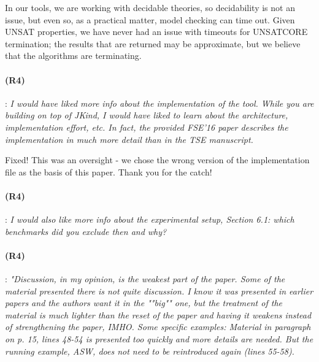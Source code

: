 \documentclass{article}
\begin{document}
In our tools, we are working with decidable theories, so decidability is not an issue, but even so, as a practical matter, model checking can time out.  Given UNSAT properties, we have never had an issue with timeouts for UNSATCORE termination; the results that are returned may be approximate, but we believe that the algorithms are terminating.

\paragraph{(R4)}: \textit{I would have liked more info about the implementation of the tool. While you are building on top of JKind, I would have liked to learn about the architecture, implementation effort, etc. In fact, the provided FSE'16 paper describes the implementation in much more detail than in the TSE manuscript.}
\vspace{0.05in}

Fixed!  This was an oversight - we chose the wrong version of the implementation file as the basis of this paper.  Thank you for the catch!

\paragraph{(R4)}: \textit{I would also like more info about the experimental setup, Section 6.1: which benchmarks did you exclude then and why?}
\vspace{0.05in}



\paragraph{(R4)}: \textit{"Discussion, in my opinion, is the weakest part of the paper. Some of the material presented there is not quite discussion. I know it was presented in earlier papers and the authors want it in the ""big"" one, but the treatment of the material is much lighter than the reset of the paper and having it weakens instead of strengthening the paper, IMHO. Some specific examples: Material in paragraph on p. 15, lines 48-54 is presented too quickly and more details are needed.  But the running example, ASW, does not need to be reintroduced again (lines 55-58).}
\vspace{0.05in}
\end{document}
